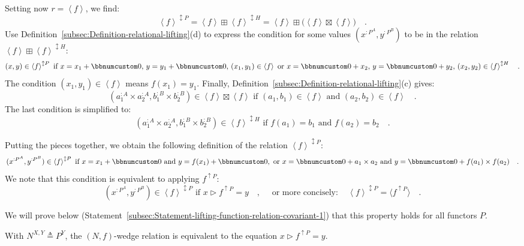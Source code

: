 Setting now $r=\left<f\right>$, we find:
\[
\left<f\right>^{\updownarrow P}=\left<f\right>\boxplus\left<f\right>^{\updownarrow H}=\left<f\right>\boxplus\big(\left<f\right>\boxtimes\left<f\right>\big)\quad.
\]
Use Definition~\ref{subsec:Definition-relational-lifting}(d) to
express the condition for some values $(x^{:P^{A}},y^{:P^{B}})$ to
be in the relation $\left<f\right>\boxplus\left<f\right>^{\updownarrow H}$:
\[
(x,y)\in\left<f\right>^{\updownarrow P}\text{ if }x=x_{1}+\bbnum 0,\,y=y_{1}+\bbnum 0,\,(x_{1},y_{1})\in\left<f\right>\text{ or }x=\bbnum 0+x_{2},\,y=\bbnum 0+y_{2},\,(x_{2},y_{2})\in\left<f\right>^{\updownarrow H}\quad.
\]
The condition $(x_{1},y_{1})\in\left<f\right>$ means $f(x_{1})=y_{1}$.
Finally, Definition~\ref{subsec:Definition-relational-lifting}(c)
gives:
\[
(a_{1}^{:A}\times a_{2}^{:A},b_{1}^{:B}\times b_{2}^{:B})\in\left<f\right>\boxtimes\left<f\right>\text{ if }(a_{1},b_{1})\in\left<f\right>\text{ and }(a_{2},b_{2})\in\left<f\right>\quad.
\]
The last condition is simplified to:
\[
(a_{1}^{:A}\times a_{2}^{:A},b_{1}^{:B}\times b_{2}^{:B})\in\left<f\right>^{\updownarrow H}\text{ if }f(a_{1})=b_{1}\text{ and }f(a_{2})=b_{2}\quad.
\]

Putting the pieces together, we obtain the following definition of
the relation $\left<f\right>^{\updownarrow P}$:
\[
(x^{:P^{A}},y^{:P^{B}})\in\left<f\right>^{\updownarrow P}\text{ if }x=x_{1}+\bbnum 0\text{ and }y=f(x_{1})+\bbnum 0,\text{ or }x=\bbnum 0+a_{1}\times a_{2}\text{ and }y=\bbnum 0+f(a_{1})\times f(a_{2})\quad.
\]
We note that this condition is equivalent to applying $f^{\uparrow P}$:
\[
(x^{:P^{A}},y^{:P^{B}})\in\left<f\right>^{\updownarrow P}\text{ if }x\triangleright f^{\uparrow P}=y\quad,\quad\text{ or more concisely}:\quad\left<f\right>^{\updownarrow P}=\langle f^{\uparrow P}\rangle\quad.
\]

We will prove below (Statement~\ref{subsec:Statement-lifting-function-relation-covariant-1})
that this property holds for all functors $P$.

With $N^{X,Y}\triangleq P^{Y}$, the $\left(N,f\right)$-wedge relation
is equivalent to the equation $x\triangleright f^{\uparrow P}=y$.

